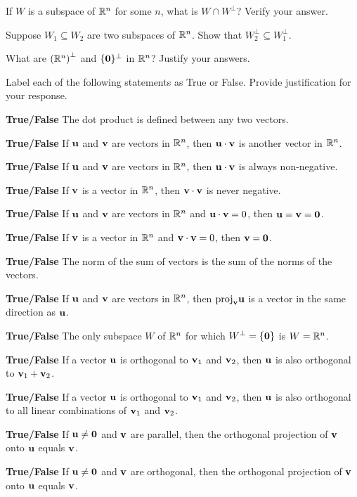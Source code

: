 \item If $W$ is a subspace of $\mathbb{R}^n$ for some $n$, what is $W \cap W^{\perp}$? Verify your answer. 

\item Suppose $W_1\subseteq W_2$ are two subspaces of $\mathbb{R}^n$. Show that $W_2^\perp \subseteq W_1^\perp$.

\item What are $\left(\mathbb{R}^n\right)^{\perp}$ and $\{\mathbf{0}\}^{\perp}$ in $\mathbb{R}^n$? Justify your answers. 

\item Label each of the following statements as True or False. Provide justification for your response.
	\ba
	\item \textbf{True/False} The dot product is defined between any two vectors. 
	\item \textbf{True/False} If $\mathbf{u}$ and $\mathbf{v}$ are vectors in $\mathbb{R}^n$, then $\mathbf{u} \cdot \mathbf{v}$ is another vector in $\mathbb{R}^n$. 
	\item \textbf{True/False} If $\mathbf{u}$ and $\mathbf{v}$ are vectors in $\mathbb{R}^n$, then $\mathbf{u} \cdot \mathbf{v}$ is always non-negative.
	\item \textbf{True/False} If $\mathbf{v}$ is a vector in $\mathbb{R}^n$, then $\mathbf{v} \cdot \mathbf{v}$ is never negative.
	\item \textbf{True/False} If $\mathbf{u}$ and $\mathbf{v}$ are vectors in $\mathbb{R}^n$ and $\mathbf{u} \cdot \mathbf{v} = 0$, then $\mathbf{u} = \mathbf{v} = \mathbf{0}$. 
	\item \textbf{True/False} If $\mathbf{v}$ is a vector in $\mathbb{R}^n$ and $\mathbf{v} \cdot \mathbf{v} = 0$, then $\mathbf{v} = \mathbf{0}$. 
	\item \textbf{True/False} The norm of the sum of vectors is the sum of the norms of the vectors. 
	\item \textbf{True/False} If $\mathbf{u}$ and $\mathbf{v}$ are vectors in $\mathbb{R}^n$, then $\text{proj}_{\mathbf{v}} \mathbf{u}$ is a vector in the same direction as $\mathbf{u}$. 
	\item \textbf{True/False} The only subspace $W$ of $\mathbb{R}^n$ for which $W^\perp=\{\mathbf{0}\}$ is $W=\mathbb{R}^n$.
	\item \textbf{True/False} If a vector $\mathbf{u}$ is orthogonal to $\mathbf{v}_1$ and $\mathbf{v}_2$, then $\mathbf{u}$ is also orthogonal to $\mathbf{v}_1+\mathbf{v}_2$.
	\item \textbf{True/False} If a vector $\mathbf{u}$ is orthogonal to $\mathbf{v}_1$ and $\mathbf{v}_2$, then $\mathbf{u}$ is also orthogonal to all linear combinations of $\mathbf{v}_1$ and $\mathbf{v}_2$.
	\item \textbf{True/False} If $\mathbf{u}\neq \mathbf{0}$ and $\mathbf{v}$ are parallel, then the orthogonal projection of $\mathbf{v}$ onto $\mathbf{u}$ equals $\mathbf{v}$.
	\item \textbf{True/False} If $\mathbf{u}\neq \mathbf{0}$ and $\mathbf{v}$ are orthogonal, then the orthogonal projection of $\mathbf{v}$ onto $\mathbf{u}$ equals $\mathbf{v}$.
